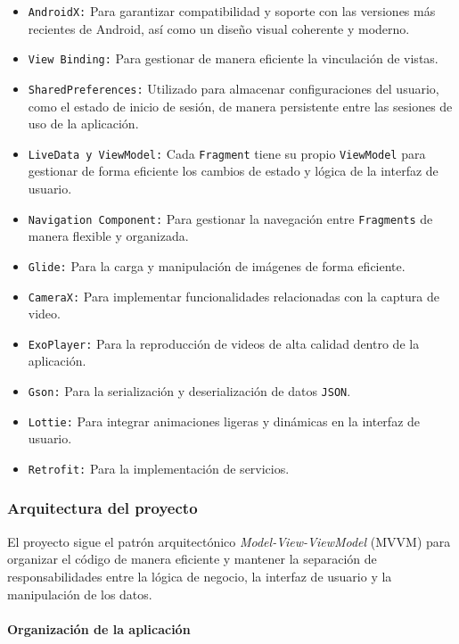 \begin{itemize}
    \item \texttt{AndroidX:} Para garantizar compatibilidad y soporte con las versiones más recientes de Android, así como un diseño visual coherente y moderno.
    \item \texttt{View Binding:} Para gestionar de manera eficiente la vinculación de vistas.
    \item \texttt{SharedPreferences:} Utilizado para almacenar configuraciones del usuario, como el estado de inicio de sesión, de manera persistente entre las sesiones de uso de la aplicación.
    \item \texttt{LiveData y ViewModel:} Cada  \texttt{Fragment} tiene su propio  \texttt{ViewModel} para gestionar de forma eficiente los cambios de estado y lógica de la interfaz de usuario.
    \item \texttt{Navigation Component:} Para gestionar la navegación entre  \texttt{Fragments} de manera flexible y organizada.
    \item \texttt{Glide:} Para la carga y manipulación de imágenes de forma eficiente.
    \item \texttt{CameraX:} Para implementar funcionalidades relacionadas con la captura de video.
    \item \texttt{ExoPlayer:} Para la reproducción de videos de alta calidad dentro de la aplicación.
    \item \texttt{Gson:} Para la serialización y deserialización de datos \texttt{JSON}.
    \item \texttt{Lottie:} Para integrar animaciones ligeras y dinámicas en la interfaz de usuario.
    \item \texttt{Retrofit:} Para la implementación de servicios. 
\end{itemize}


\subsubsection{Arquitectura del proyecto}

El proyecto sigue el patrón arquitectónico \textit{Model-View-ViewModel} (MVVM) para organizar el código de manera eficiente y mantener la separación de responsabilidades entre la lógica de negocio, la interfaz de usuario y la manipulación de los datos.

\paragraph{Organización de la aplicación}

